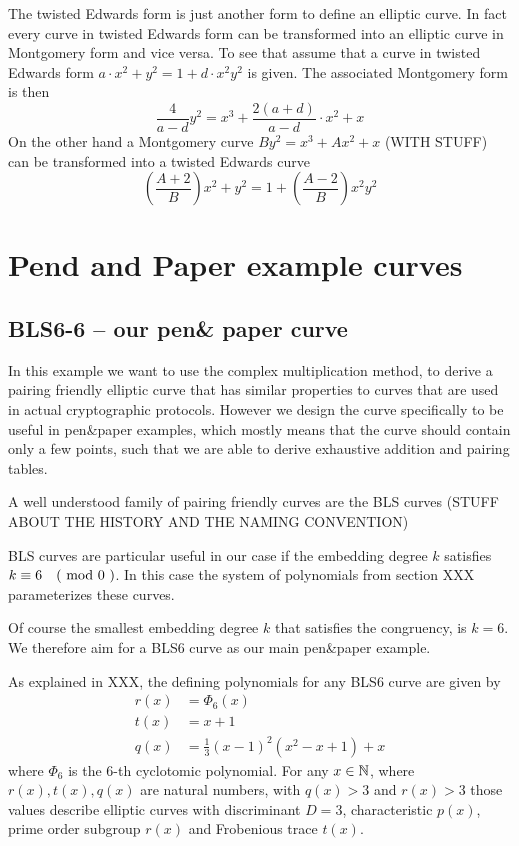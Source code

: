 The twisted Edwards form is just another form to define an elliptic curve. In fact every curve in twisted Edwards form can be transformed into an elliptic curve in Montgomery form and vice versa. To see that assume that a curve in twisted Edwards form $a\cdot x^2+y^2= 1+d\cdot x^2y^2$ is given. The associated Montgomery form is then
$$
\frac{4}{a-d} y^2 = x^3 + \frac{2(a+d)}{a-d}\cdot x^2 + x 
$$
On the other hand a Montgomery curve $By^{2}=x^{3}+Ax^{2}+x$ (WITH STUFF) can be transformed into a twisted Edwards curve 
$$
(\frac{A+2}{B})x^2+y^2= 1+(\frac{A-2}{B})x^2y^2
$$


\section{Pend and Paper example curves}
\subsection{BLS6-6 -- our pen\& paper curve}
In this example we want to use the complex multiplication method, to derive a pairing friendly elliptic curve that has similar properties to curves that are used in actual cryptographic protocols. However we design the curve specifically to be useful in pen\&{}paper examples, which mostly means that the curve should contain only a few points, such that we are able to derive exhaustive addition and pairing tables.

A well understood family of pairing friendly curves are the BLS curves (STUFF ABOUT THE HISTORY AND THE NAMING CONVENTION)

BLS curves are particular useful in our case if the embedding degree $k$ satisfies $k \equiv 6 \quad \text{( mod } 0 \text{ )}$. In this case the system of polynomials from section XXX parameterizes these curves.

Of course the smallest embedding degree $k$ that satisfies the congruency, is $k=6$. We therefore aim for a BLS6 curve as our main pen\&{}paper example. 

As explained in XXX, the defining polynomials for any BLS6 curve are given by
\begin{align*}
r(x) &= \Phi_6(x)\\
t(x) &= x+1\\
q(x) &= \frac{1}{3}(x-1)^2(x^{2}-x+1) +x
\end{align*}
where $\Phi_6$ is the $6$-th cyclotomic polynomial. For any $x\in\mathbb{N}$, where $r(x),t(x),q(x)$ are natural numbers, with $q(x)>3$ and $r(x)>3$ those values describe elliptic curves with discriminant $D=3$, characteristic $p(x)$, prime order subgroup $r(x)$ and Frobenious trace $t(x)$.  

